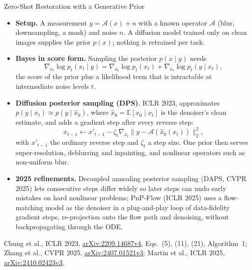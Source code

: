 \begin{frame}{Zero-Shot Restoration with a Generative Prior}
  \begin{itemize}\footnotesize\itemsep0.35em
    \item \textbf{Setup.} A measurement $y = \mathcal{A}(x) + n$ with a known operator $\mathcal{A}$ (blur, downsampling, a mask) and noise $n$. A diffusion model trained only on clean images supplies the prior $p(x)$; nothing is retrained per task.
    \item \textbf{Bayes in score form.} Sampling the posterior $p(x \mid y)$ needs
    \[ \nabla_{x_t} \log p_t(x_t \mid y) = \nabla_{x_t} \log p_t(x_t) + \nabla_{x_t} \log p_t(y \mid x_t), \]
    the score of the prior plus a likelihood term that is intractable at intermediate noise levels $t$.
    \item \textbf{Diffusion posterior sampling (DPS)}, ICLR 2023, approximates $p(y \mid x_t) \approx p(y \mid \hat{x}_0)$, where $\hat{x}_0 = \mathbb{E}[x_0 \mid x_t]$ is the denoiser's clean estimate, and adds a gradient step after every reverse step:
    \[ x_{t-1} \leftarrow x'_{t-1} - \zeta_t \nabla_{x_t} \big\| y - \mathcal{A}(\hat{x}_0(x_t)) \big\|_2^2 , \]
    with $x'_{t-1}$ the ordinary reverse step and $\zeta_t$ a step size. One prior then serves super-resolution, deblurring and inpainting, and nonlinear operators such as non-uniform blur.
    \item \textbf{2025 refinements.} Decoupled annealing posterior sampling (DAPS, CVPR 2025) lets consecutive steps differ widely so later steps can undo early mistakes on hard nonlinear problems; PnP-Flow (ICLR 2025) uses a flow-matching model as the denoiser in a plug-and-play loop of data-fidelity gradient steps, re-projection onto the flow path and denoising, without backpropagating through the ODE.
  \end{itemize}
  \vspace{0.1em}
  {\scriptsize Chung et al., ICLR 2023, \href{https://arxiv.org/abs/2209.14687v4}{arXiv:2209.14687v4}, Eqs.~(5), (11), (21), Algorithm~1; Zhang et al., CVPR 2025, \href{https://arxiv.org/abs/2407.01521v3}{arXiv:2407.01521v3}; Martin et al., ICLR 2025, \href{https://arxiv.org/abs/2410.02423v3}{arXiv:2410.02423v3}.\par}
\end{frame}
